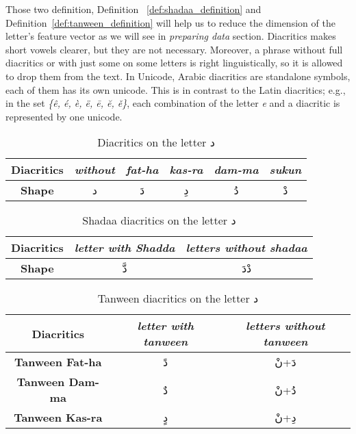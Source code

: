 Those two definition, Definition ~\ref{def:shadaa_definition} and Definition~\ref{def:tanween_definition}  will help us to reduce the dimension of the letter's feature vector as we will see in \textit{preparing data} section.%
Diacritics makes short vowels clearer, but they are not necessary.
Moreover, a phrase without full diacritics or with just some on some letters is
right linguistically, so it is allowed to drop them from the text.%
In Unicode, Arabic diacritics are standalone symbols, each of them has its own unicode. This is in contrast to the Latin diacritics; e.g., in the set \textit{\{ê, é, è, ë, ē, ĕ, ě\}}, each combination of the letter \textit{e} and a diacritic is represented by one unicode.%

\begin{table}[t]
	\centering
	\begin{tabular}{c c c c c c}
		\toprule
		\textbf{\small{Diacritics}}     & \small{\textit{without}} & \small{\textit{fat-ha}} &
		\small{\textit{kas-ra}} & \small{\textit{dam-ma}} & \small{\textit{sukun}}\\
		\midrule
		\textbf{\small{Shape}}   & \textarabic{د} & \textarabic{دَ} & \textarabic{دِ} &
		\textarabic{دُ} & \textarabic{دْ}\\
		\bottomrule
	\end{tabular}
	\caption{Diacritics on the letter  \textarabic{ د }}\label{Tab:Diacritics_Dal}
\end{table}%


\begin{table}[t]
	\centering
	\begin{tabular}{c c c}
		\toprule
		\textbf{\small{Diacritics}} & \small{\textit{letter with Shadda }} & \small{\textit{letters without shadaa  }} \\
		\midrule
		\textbf{\small{Shape}}  & \textarabic{دَّ} &  \textarabic{دْدَ}\\
		\bottomrule
	\end{tabular}
	\caption{Shadaa diacritics on the letter  \textarabic{ د }}\label{Tab:Shadda_Dal}
\end{table}%

\begin{table}[t]
	\centering
	\begin{tabular}{c c c}
		\toprule
		\textbf{\small{Diacritics}} & \small{\textit{letter with tanween }} & \small{\textit{letters without tanween}} \\
		\midrule
          \textbf{\small{Tanween Fat-ha}}  & \textarabic{دً} &  \textarabic{دَ+نْ}\\
          \textbf{\small{Tanween Dam-ma}}  & \textarabic{دٌ} &  \textarabic{دُ+نْ}\\
          \textbf{\small{Tanween Kas-ra}}  & \textarabic{دٍ} &  \textarabic{دِ+نْ}\\
		\bottomrule
	\end{tabular}
	\caption{Tanween diacritics on the letter  \textarabic{ د }} \label{Tab:Tanween_Dal}
\end{table}%



